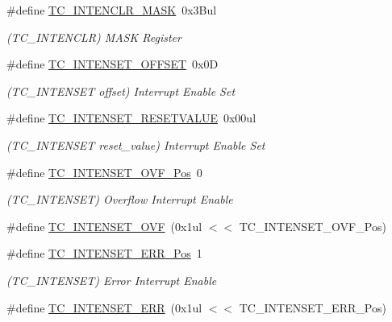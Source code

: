 \begin{DoxyCompactItemize}
\item 
\#define \mbox{\hyperlink{group___s_a_m_d21___t_c_ga5a020033ada1e4c780d4c58366687acb}{T\+C\+\_\+\+I\+N\+T\+E\+N\+C\+L\+R\+\_\+\+M\+A\+SK}}~0x3\+Bul
\begin{DoxyCompactList}\small\item\em (T\+C\+\_\+\+I\+N\+T\+E\+N\+C\+LR) M\+A\+SK Register \end{DoxyCompactList}\item 
\#define \mbox{\hyperlink{group___s_a_m_d21___t_c_gaa152673d834fb0e9adb1484a59231947}{T\+C\+\_\+\+I\+N\+T\+E\+N\+S\+E\+T\+\_\+\+O\+F\+F\+S\+ET}}~0x0D
\begin{DoxyCompactList}\small\item\em (T\+C\+\_\+\+I\+N\+T\+E\+N\+S\+ET offset) Interrupt Enable Set \end{DoxyCompactList}\item 
\#define \mbox{\hyperlink{group___s_a_m_d21___t_c_gada1fd36f73b5409aaade918db17549aa}{T\+C\+\_\+\+I\+N\+T\+E\+N\+S\+E\+T\+\_\+\+R\+E\+S\+E\+T\+V\+A\+L\+UE}}~0x00ul
\begin{DoxyCompactList}\small\item\em (T\+C\+\_\+\+I\+N\+T\+E\+N\+S\+ET reset\+\_\+value) Interrupt Enable Set \end{DoxyCompactList}\item 
\#define \mbox{\hyperlink{group___s_a_m_d21___t_c_gab2ff8ba9f2b0d7ecc5c5451da3429492}{T\+C\+\_\+\+I\+N\+T\+E\+N\+S\+E\+T\+\_\+\+O\+V\+F\+\_\+\+Pos}}~0
\begin{DoxyCompactList}\small\item\em (T\+C\+\_\+\+I\+N\+T\+E\+N\+S\+ET) Overflow Interrupt Enable \end{DoxyCompactList}\item 
\#define \mbox{\hyperlink{group___s_a_m_d21___t_c_ga48976807e0a0c60c70bce24f1c0f7e1d}{T\+C\+\_\+\+I\+N\+T\+E\+N\+S\+E\+T\+\_\+\+O\+VF}}~(0x1ul $<$$<$ T\+C\+\_\+\+I\+N\+T\+E\+N\+S\+E\+T\+\_\+\+O\+V\+F\+\_\+\+Pos)
\item 
\#define \mbox{\hyperlink{group___s_a_m_d21___t_c_ga96296c6832f62b741447c9226dee8327}{T\+C\+\_\+\+I\+N\+T\+E\+N\+S\+E\+T\+\_\+\+E\+R\+R\+\_\+\+Pos}}~1
\begin{DoxyCompactList}\small\item\em (T\+C\+\_\+\+I\+N\+T\+E\+N\+S\+ET) Error Interrupt Enable \end{DoxyCompactList}\item 
\#define \mbox{\hyperlink{group___s_a_m_d21___t_c_gaa51b27ce018d95a3a16f79acb17a0cb6}{T\+C\+\_\+\+I\+N\+T\+E\+N\+S\+E\+T\+\_\+\+E\+RR}}~(0x1ul $<$$<$ T\+C\+\_\+\+I\+N\+T\+E\+N\+S\+E\+T\+\_\+\+E\+R\+R\+\_\+\+Pos)

\end{DoxyCompactItemize}
